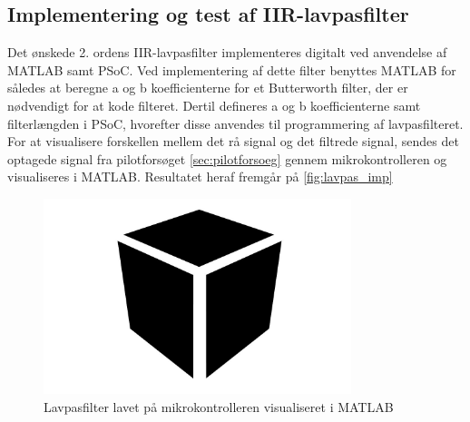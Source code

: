 \subsection{Implementering og test af IIR-lavpasfilter}
Det ønskede 2. ordens IIR-lavpasfilter implementeres digitalt ved anvendelse af MATLAB samt PSoC.
Ved implementering af dette filter benyttes MATLAB for således at beregne a og b koefficienterne for et Butterworth filter, der er nødvendigt for at kode filteret. Dertil defineres a og b koefficienterne samt filterlængden i PSoC, hvorefter disse anvendes til programmering af lavpasfilteret. 
For at visualisere forskellen mellem det rå signal og det filtrede signal, sendes det optagede signal fra pilotforsøget \autoref{sec:pilotforsoeg} gennem mikrokontrolleren og visualiseres i MATLAB. Resultatet heraf fremgår på \autoref{fig:lavpas_imp}


\begin{figure}[H]
\centering
\includegraphics[width=0.8\textwidth]{figures/Pilotforsoeg/blackbox}
\caption{Lavpasfilter lavet på mikrokontrolleren visualiseret i MATLAB}
\label{fig:lavpas_imp}
\end{figure}
 